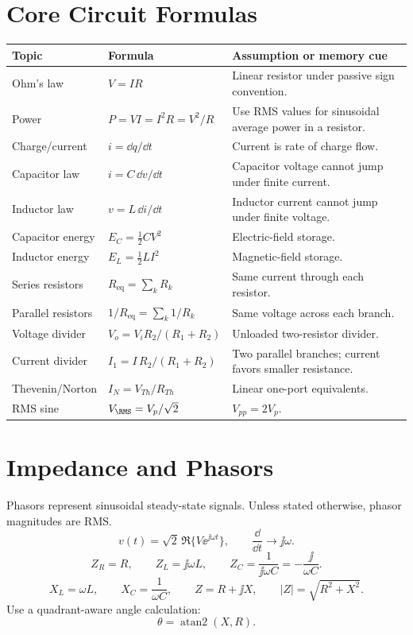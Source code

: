 \section{Core Circuit Formulas}
\begin{longtable}{@{}L{0.25\textwidth}L{0.32\textwidth}L{0.34\textwidth}@{}}
\toprule
Topic & Formula & Assumption or memory cue \\
\midrule
\endhead
Ohm's law & \(V=IR\) & Linear resistor under passive sign convention. \\
Power & \(P=VI=I^2R=V^2/R\) & Use RMS values for sinusoidal average power in a resistor. \\
Charge/current & \(i=\dd q/\dd t\) & Current is rate of charge flow. \\
Capacitor law & \(i=C\,\dd v/\dd t\) & Capacitor voltage cannot jump under finite current. \\
Inductor law & \(v=L\,\dd i/\dd t\) & Inductor current cannot jump under finite voltage. \\
Capacitor energy & \(E_C=\frac{1}{2}CV^2\) & Electric-field storage. \\
Inductor energy & \(E_L=\frac{1}{2}LI^2\) & Magnetic-field storage. \\
Series resistors & \(R_{\mathrm{eq}}=\sum_k R_k\) & Same current through each resistor. \\
Parallel resistors & \(1/R_{\mathrm{eq}}=\sum_k 1/R_k\) & Same voltage across each branch. \\
Voltage divider & \(V_o=V_i R_2/(R_1+R_2)\) & Unloaded two-resistor divider. \\
Current divider & \(I_1=I\,R_2/(R_1+R_2)\) & Two parallel branches; current favors smaller resistance. \\
Thevenin/Norton & \(I_N=V_{Th}/R_{Th}\) & Linear one-port equivalents. \\
RMS sine & \(V_{\RMS}=V_p/\sqrt{2}\) & \(V_{pp}=2V_p\). \\
\bottomrule
\end{longtable}

\section{Impedance and Phasors}
Phasors represent sinusoidal steady-state signals. Unless stated otherwise,
phasor magnitudes are RMS.
\[
v(t)=\sqrt{2}\,\Re\{V\ee^{\jj\omega t}\},
\qquad
\frac{\dd}{\dd t}\longrightarrow \jj\omega .
\]
\[
Z_R=R,\qquad Z_L=\jj\omega L,\qquad
Z_C=\frac{1}{\jj\omega C}=-\frac{\jj}{\omega C}.
\]
\[
X_L=\omega L,\qquad X_C=\frac{1}{\omega C},\qquad
Z=R+\jj X,\qquad |Z|=\sqrt{R^2+X^2}.
\]
Use a quadrant-aware angle calculation:
\[
\theta=\operatorname{atan2}(X,R).
\]

